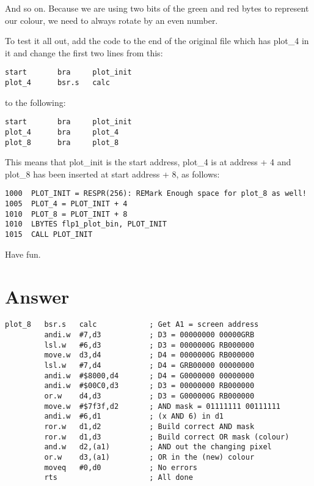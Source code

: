 And so on. Because we are using two bits of the green and red bytes
    to represent our colour, we need to always rotate by an even
    number.

To test it all out, add the code to the end of the original file
    which has plot\_4 in it and change the first two lines from this:

\begin{lstlisting}[firstnumber=1,]
start       bra     plot_init
plot_4      bsr.s   calc
\end{lstlisting}

to the following:

\begin{lstlisting}[firstnumber=1,]
start       bra     plot_init
plot_4      bra     plot_4
plot_8      bra     plot_8
\end{lstlisting}

This means that plot\_init is the start address, plot\_4 is at address
    + 4 and plot\_8 has been inserted at start address + 8, as follows:

\begin{lstlisting}[firstnumber=1,language={}]
1000  PLOT_INIT = RESPR(256): REMark Enough space for plot_8 as well!
1005  PLOT_4 = PLOT_INIT + 4
1010  PLOT_8 = PLOT_INIT + 8
1010  LBYTES flp1_plot_bin, PLOT_INIT
1015  CALL PLOT_INIT
\end{lstlisting}

Have fun.

\section{Answer}
\label{ch8-answers}%
\begin{lstlisting}[firstnumber=1,caption={Mode 8 Screen Plotting},label={lst:Mode8ScreenPlotting}]
plot_8   bsr.s   calc            ; Get A1 = screen address
         andi.w  #7,d3           ; D3 = 00000000 00000GRB
         lsl.w   #6,d3           ; D3 = 0000000G RB000000
         move.w  d3,d4           ; D4 = 0000000G RB000000
         lsl.w   #7,d4           ; D4 = GRB00000 00000000
         andi.w  #$8000,d4       ; D4 = G0000000 00000000
         andi.w  #$00C0,d3       ; D3 = 00000000 RB000000
         or.w    d4,d3           ; D3 = G000000G RB000000
         move.w  #$7f3f,d2       ; AND mask = 01111111 00111111
         andi.w  #6,d1           ; (x AND 6) in d1
         ror.w   d1,d2           ; Build correct AND mask
         ror.w   d1,d3           ; Build correct OR mask (colour)
         and.w   d2,(a1)         ; AND out the changing pixel
         or.w    d3,(a1)         ; OR in the (new) colour
         moveq   #0,d0           ; No errors
         rts                     ; All done
\end{lstlisting}

